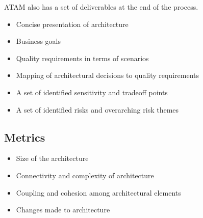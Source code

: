 \documentclass{sty/SizheArticle}
\begin{document}

ATAM also has a set of deliverables at the end of the process.
\begin{itemize}
\item Concise presentation of architecture
\item Business goals
\item Quality requirements in terms of scenarios
\item Mapping of architectural decisions to quality requirements
\item A set of identified sensitivity and tradeoff points
\item A set of identified risks and overarching risk themes
\end{itemize}

\subsection{Metrics}
\begin{itemize}
\item Size of the architecture
\item Connectivity and complexity of architecture
\item Coupling and cohesion among architectural elements
\item Changes made to architecture
\end{itemize}



\end{document}
